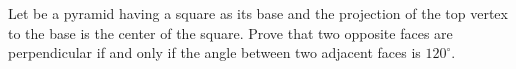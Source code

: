 Let be a pyramid having a square as its base and the projection of the top vertex to the base is the center of the square. Prove that two opposite faces are perpendicular if and only if the angle between two adjacent faces is $ 120^{\circ } . $